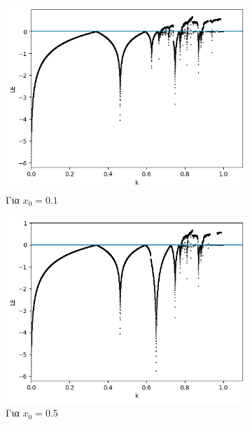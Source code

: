 \begin{figure}[ht]
	\centering
	\begin{subfigure}[b]{0.7\textwidth}
		\centering
		\includegraphics[width=\textwidth]{LateX images/graphs q16/g7}
		\caption{Για \(x_0=0.1\)}
		\label{f:g33}
	\end{subfigure}
	\hfill
	\begin{subfigure}[b]{0.7\textwidth}
		\centering
		\includegraphics[width=\textwidth]{LateX images/graphs q16/g8}
		\caption{Για \(x_0=0.5\)}
		\label{f:g34}
	\end{subfigure}
	\hfill
	\begin{subfigure}[b]{0.7\textwidth}
		\centering

\end{subfigure}
\end{figure}
